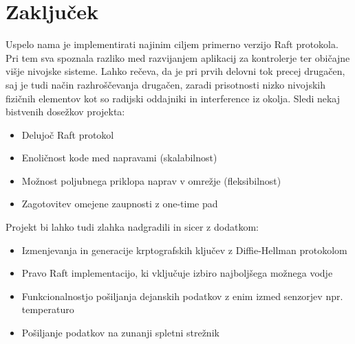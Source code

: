 \documentclass[runningheads]{llncs}
\begin{document}
\section{Zaključek}
Uspelo nama je implementirati najinim ciljem primerno verzijo Raft protokola. Pri tem sva spoznala razliko med razvijanjem aplikacij za kontrolerje ter običajne višje nivojske sisteme. Lahko rečeva, da je pri prvih delovni tok precej drugačen, saj je tudi način razhroščevanja drugačen, zaradi prisotnosti nizko nivojskih fizičnih elementov kot so radijski oddajniki in interference iz okolja. Sledi nekaj bistvenih dosežkov projekta: \\
\begin{itemize}
\item Delujoč Raft protokol 
\item Enoličnost kode med napravami (skalabilnost)
\item Možnost poljubnega priklopa naprav v omrežje (fleksibilnost)
\item Zagotovitev omejene zaupnosti z one-time pad
\end{itemize}

Projekt bi lahko tudi zlahka nadgradili in sicer z dodatkom:
\begin{itemize}
\item Izmenjevanja in generacije krptografskih ključev z Diffie-Hellman protokolom
\item Pravo Raft implementacijo, ki vključuje izbiro najboljšega možnega vodje
\item Funkcionalnostjo pošiljanja dejanskih podatkov z enim izmed senzorjev npr. temperaturo
\item Pošiljanje podatkov na zunanji spletni strežnik
\end{itemize}
\end{document}
